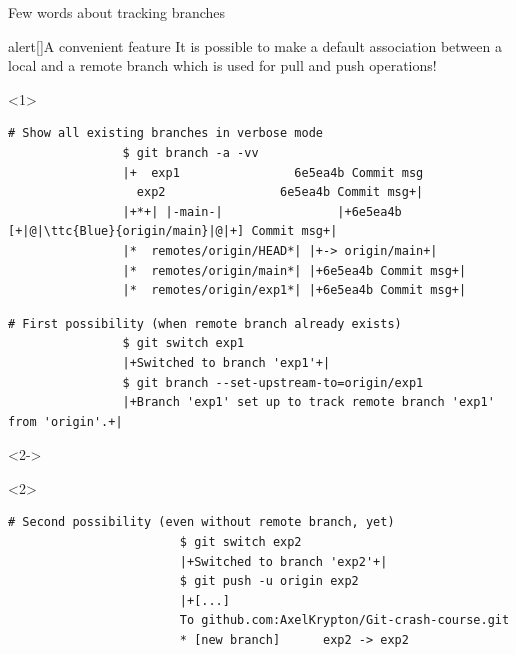 \documentclass[usenames,svgnames,14pt]{beamer}
\newcommand{\ttc}[2]{\texttt{\textcolor{#1}{#2}}}%
\begin{document}
\begin{frame}[fragile]{Few words about tracking branches}
    \begin{varblock}{alert}[\textwidth]{A convenient feature}
        It is possible to make a default association between a local and a remote branch which is used for pull and push operations!
    \end{varblock}
    \begin{overlayarea}{\textwidth}{0.85\textheight}
        \begin{onlyenv}<1>
            \begin{lstlisting}[style=MyBash, xrightmargin=-1mm, xleftmargin=-1mm, aboveskip=4mm]
                # Show all existing branches in verbose mode
                $ git branch -a -vv
                |+  exp1                6e5ea4b Commit msg
                  exp2                6e5ea4b Commit msg+|
                |+*+| |-main-|                |+6e5ea4b [+|@|\ttc{Blue}{origin/main}|@|+] Commit msg+|
                |*  remotes/origin/HEAD*| |+-> origin/main+|
                |*  remotes/origin/main*| |+6e5ea4b Commit msg+|
                |*  remotes/origin/exp1*| |+6e5ea4b Commit msg+|
            \end{lstlisting}
            \begin{lstlisting}[style=MyBash, xrightmargin=-1mm, xleftmargin=-1mm, aboveskip=2mm]
                # First possibility (when remote branch already exists)
                $ git switch exp1
                |+Switched to branch 'exp1'+|
                $ git branch --set-upstream-to=origin/exp1
                |+Branch 'exp1' set up to track remote branch 'exp1' from 'origin'.+|
            \end{lstlisting}
        \end{onlyenv}
        \begin{onlyenv}<2->
            \begin{overlayarea}{\textwidth}{0.353\textheight}
                \begin{onlyenv}<2>
                    \begin{lstlisting}[style=MyBash, xrightmargin=-1mm, xleftmargin=-1mm, aboveskip=4mm]
                        # Second possibility (even without remote branch, yet)
                        $ git switch exp2
                        |+Switched to branch 'exp2'+|
                        $ git push -u origin exp2
                        |+[...]
                        To github.com:AxelKrypton/Git-crash-course.git
                        * [new branch]      exp2 -> exp2

\end{lstlisting}
\end{onlyenv}
\end{overlayarea}
\end{onlyenv}
\end{overlayarea}
\end{frame}
\end{document}

